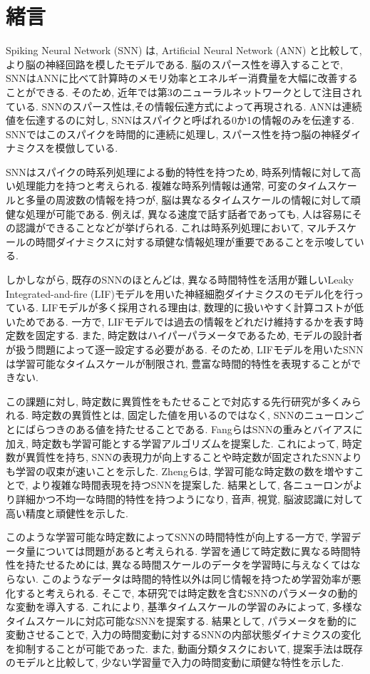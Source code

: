 \section{緒言}
Spiking Neural Network (SNN) は, Artificial Neural Network (ANN) と比較して, より脳の神経回路を模したモデルである\cite{TAVANAEI201947}.
脳のスパース性を導入することで, SNNはANNに比べて計算時のメモリ効率とエネルギー消費量を大幅に改善することができる.
そのため, 近年では第3のニューラルネットワークとして注目されている\cite{Henkes2024}.
SNNのスパース性は,その情報伝達方式によって再現される.
ANNは連続値を伝達するのに対し, SNNはスパイクと呼ばれる0か1の情報のみを伝達する.
SNNではこのスパイクを時間的に連続に処理し, スパース性を持つ脳の神経ダイナミクスを模倣している.

SNNはスパイクの時系列処理による動的特性を持つため, 時系列情報に対して高い処理能力を持つと考えられる\cite{zheng2024temporal}.
複雑な時系列情報は通常, 可変のタイムスケールと多量の周波数の情報を持つが, 脳は異なるタイムスケールの情報に対して頑健な処理が可能である\cite{10.1162/jocn_a_01615}.
例えば, 異なる速度で話す話者であっても, 人は容易にその認識ができることなどが挙げられる.
これは時系列処理において, マルチスケールの時間ダイナミクスに対する頑健な情報処理が重要であることを示唆している.

しかしながら, 既存のSNNのほとんどは, 異なる時間特性を活用が難しいLeaky Integrated-and-fire (LIF)モデルを用いた神経細胞ダイナミクスのモデル化を行っている\cite{dayan2003theoretical}.
LIFモデルが多く採用される理由は, 数理的に扱いやすく計算コストが低いためである.
一方で, LIFモデルでは過去の情報をどれだけ維持するかを表す時定数を固定する.
また, 時定数はハイパーパラメータであるため, モデルの設計者が扱う問題によって逐一設定する必要がある.
そのため, LIFモデルを用いたSNNは学習可能なタイムスケールが制限され, 豊富な時間的特性を表現することができない.

この課題に対し, 時定数に異質性をもたせることで対応する先行研究が多くみられる\cite{10.1145/3407197.3407225}\cite{ParametricSNN}.
時定数の異質性とは, 固定した値を用いるのではなく, SNNのニューロンごとにばらつきのある値を持たせることである.
Fangら\cite{ParametricSNN}はSNNの重みとバイアスに加え, 時定数も学習可能とする学習アルゴリズムを提案した.
これによって, 時定数が異質性を持ち, SNNの表現力が向上することや時定数が固定されたSNNよりも学習の収束が速いことを示した.
Zhengら\cite{zheng2024temporal}は, 学習可能な時定数の数を増やすことで, より複雑な時間表現を持つSNNを提案した.
結果として, 各ニューロンがより詳細かつ不均一な時間的特性を持つようになり, 音声, 視覚, 脳波認識に対して高い精度と頑健性を示した.

このような学習可能な時定数によってSNNの時間特性が向上する一方で, 学習データ量については問題があると考えられる.
学習を通じて時定数に異なる時間特性を持たせるためには, 異なる時間スケールのデータを学習時に与えなくてはならない.
このようなデータは時間的特性以外は同じ情報を持つため学習効率が悪化すると考えられる.
そこで, 本研究では時定数を含むSNNのパラメータの動的な変動を導入する.
これにより, 基準タイムスケールの学習のみによって, 多様なタイムスケールに対応可能なSNNを提案する.
結果として, パラメータを動的に変動させることで, 入力の時間変動に対するSNNの内部状態ダイナミクスの変化を抑制することが可能であった.
また, 動画分類タスクにおいて, 提案手法は既存のモデルと比較して, 少ない学習量で入力の時間変動に頑健な特性を示した.

